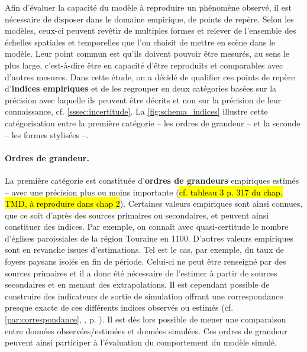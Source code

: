 Afin d’évaluer la capacité du modèle à reproduire un phénomène observé, il est nécessaire de disposer dans le domaine empirique, de \og points de repère\fg{}.
Selon les modèles, ceux-ci peuvent revêtir de multiples formes et relever de l'ensemble des échelles spatiales et temporelles que l'on choisit de mettre en scène dans le modèle.
Leur point commun est qu'ils doivent pouvoir être mesurés, au sens le plus large, c'est-à-dire être en capacité d'être reproduits et comparables avec d'autres mesures.
Dans cette étude, on a décidé de qualifier ces points de repère d'\og\textbf{indices empiriques}\fg{} et de les regrouper en deux catégories basées sur la précision avec laquelle ils peuvent être décrits et non sur la précision de leur connaissance, cf. \cref{sssec:incertitude}.
La \cref{fig:schema_indices} illustre cette catégorisation entre la première catégorie -- les ordres de grandeur -- et la seconde -- les formes stylisées --.

\paragraph{Ordres de grandeur.}
La première catégorie est constituée d'\textbf{ordres de grandeurs} empiriques estimés -- avec une précision plus ou moins importante (\hl{cf. tableau 3 p. 317 du chap. TMD, à reproduire dans chap 2}).
Certaines valeurs empiriques sont ainsi connues, que ce soit d'après des sources primaires ou secondaires, et peuvent ainsi constituer des indices.
Par exemple, on connaît avec quasi-certitude le nombre d'églises paroissiales de la région Touraine en 1100.
D'autres valeurs empiriques sont en revanche issues d'estimations.
Tel est le cas, par exemple, du taux de foyers paysans isolés en fin de période.
Celui-ci ne peut être renseigné par des sources primaires et il a donc été nécessaire de l'estimer à partir de sources secondaires et en menant des extrapolations.
Il est cependant possible de construire des indicateurs de sortie de simulation offrant une correspondance presque exacte de ces différents indices observés ou estimés (cf. \ref{par:correspondance}, , p. \pageref{par:correspondance}).
Il est dès lors possible de mener une comparaison entre données observées/estimées et données simulées.
Ces ordres de grandeur peuvent ainsi participer à l'évaluation du comportement du modèle simulé.

